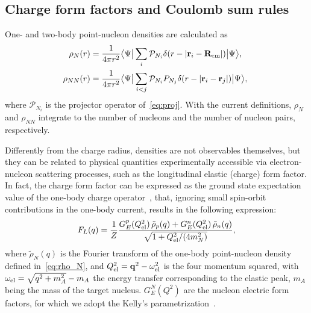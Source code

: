 \documentclass[aps,prc,twocolumn,superscriptaddress,showpacs,floatfix,nofootinbib]{revtex4-1}
\begin{document}
\subsection{Charge form factors and Coulomb sum rules}
One- and two-body point-nucleon densities are calculated as
\begin{align}
	\!\!\rho_{N}(r) &=\frac{1}{4\pi r^2}\big\langle\Psi\big|\sum_i    \mathcal P_{N_i}\delta(r-|\vb{r}_i-\vb{R}_{\rm cm}|)\big|\Psi\big\rangle, \label{eq:rho_N} \\
	\!\!\rho_{NN}(r)&=\frac{1}{4\pi r^2}\big\langle\Psi\big|\sum_{i<j}\mathcal P_{N_i}P_{N_j}\delta(r-|\vb{r}_i-\vb{r}_j|)\big|\Psi\big\rangle, \label{eq:rho_NN}
\end{align}
where $\mathcal P_{N_i}$ is the projector operator of~\cref{eq:proj}.
With the current definitions, $\rho_N$ and $\rho_{NN}$ integrate to the number 
of nucleons and the number of nucleon pairs, respectively.

Differently from the charge radius, densities are not observables themselves, 
but they can be related to physical quantities experimentally accessible via 
electron-nucleon scattering processes, such as the longitudinal elastic (charge) form factor.
In fact, the charge form factor can be expressed as the ground state expectation value of 
the one-body charge operator~\cite{Mcvoy:1962},
that, ignoring small spin-orbit contributions in the one-body current, 
results in the following expression:
\begin{align}
	F_L(q)=\frac{1}{Z}\frac{G_E^p(Q_{\rm el}^2)\,\tilde{\rho}_p(q)+G_E^n(Q_{\rm el}^2)\,\tilde{\rho}_n(q)}{\sqrt{1+Q_{\rm el}^2/(4 m_N^2)}},
	\label{eq:ff}
\end{align}
where $\tilde{\rho}_{N}(q)$ is the Fourier transform of the one-body point-nucleon density defined in~\cref{eq:rho_N}, 
and $Q^2_{\rm el}=\vb{q}^2-\omega_{\rm el}^2$ is the four momentum squared, 
with $\omega_{\rm el}=\sqrt{q^2+m_A^2}-m_A$ the energy transfer corresponding to the elastic peak,
$m_A$ being the mass of the target nucleus.
$G_E^N(Q^2)$ are the nucleon electric form factors, for which we adopt the Kelly's parametrization~\cite{Kelly:2004}.
\end{document}
